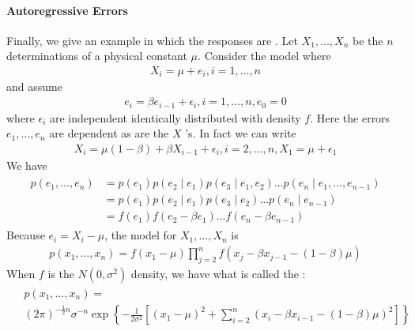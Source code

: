 \documentclass{article}
\begin{document}
\paragraph{Autoregressive Errors}
Finally, we give an example in which the responses are .
Let $X_{1}, \ldots, X_{n}$ be the $n$ determinations of a physical constant $\mu .$ Consider the model where
\begin{align*}
X_{i}=\mu+e_{i}, i=1, \ldots, n
\end{align*}
and assume
\begin{align*}
e_{i}=\beta e_{i-1}+\epsilon_{i}, i=1, \ldots, n, e_{0}=0
\end{align*}
where $\epsilon_{i}$ are independent identically distributed with density $f .$ Here the errors $e_{1}, \ldots, e_{n}$ are dependent as are the $X$ 's. In fact we can write
\begin{align*}
X_{i}=\mu(1-\beta)+\beta X_{i-1}+\epsilon_{i}, i=2, \ldots, n, X_{1}=\mu+\epsilon_{1}
\end{align*}
We have
\begin{align*}
\begin{aligned}
p\left(e_{1}, \ldots, e_{n}\right) &=p\left(e_{1}\right) p\left(e_{2} \mid e_{1}\right) p\left(e_{3} \mid e_{1}, e_{2}\right) \ldots p\left(e_{n} \mid e_{1}, \ldots, e_{n-1}\right) \\
&=p\left(e_{1}\right) p\left(e_{2} \mid e_{1}\right) p\left(e_{3} \mid e_{2}\right) \ldots p\left(e_{n} \mid e_{n-1}\right) \\
&=f\left(e_{1}\right) f\left(e_{2}-\beta e_{1}\right) \ldots f\left(e_{n}-\beta e_{n-1}\right)
\end{aligned}
\end{align*}
Because $e_{i}=X_{i}-\mu$, the model for $X_{1}, \ldots, X_{n}$ is
\begin{align*}
p\left(x_{1}, \ldots, x_{n}\right)=f\left(x_{1}-\mu\right) \prod_{j=2}^{n} f\left(x_{j}-\beta x_{j-1}-(1-\beta) \mu\right)
\end{align*}
When $f$ is the $N\left(0, \sigma^{2}\right)$ density, we have what is called the :
\begin{align*}
\begin{aligned}
&p\left(x_{1}, \ldots, x_{n}\right)= \\
&(2 \pi)^{-\frac{1}{2} n} \sigma^{-n} \exp \left\{-\frac{1}{2 \sigma^{2}}\left[\left(x_{1}-\mu\right)^{2}+\sum_{i=2}^{n}\left(x_{i}-\beta x_{i-1}-(1-\beta) \mu\right)^{2}\right]\right\}
\end{aligned}
\end{align*}
\end{document}
